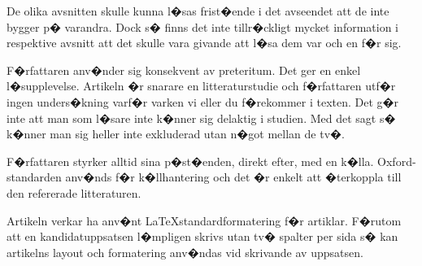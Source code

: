 \documentclass[11pt, oneside]{article}   	%
\begin{document}
De olika avsnitten skulle kunna l�sas frist�ende i det avseendet att de inte bygger p� varandra. Dock s� finns det inte tillr�ckligt mycket information i respektive avsnitt att det skulle vara givande att l�sa dem var och en f�r sig.

F�rfattaren anv�nder sig konsekvent av preteritum. Det ger en enkel l�supplevelse. Artikeln �r snarare en litteraturstudie och f�rfattaren utf�r ingen unders�kning varf�r varken vi eller du f�rekommer i texten. Det g�r inte att man som l�sare inte k�nner sig delaktig i studien. Med det sagt s� k�nner man sig heller inte exkluderad utan n�got mellan de tv�.

F�rfattaren styrker alltid sina p�st�enden, direkt efter, med en k�lla. Oxford-standarden anv�nds f�r k�llhantering och det �r enkelt att �terkoppla till den refererade litteraturen.

Artikeln verkar ha anv�nt \LaTeX standardformatering f�r artiklar. F�rutom att en kandidatuppsatsen l�mpligen skrivs utan tv� spalter per sida s� kan artikelns layout och formatering anv�ndas vid skrivande av uppsatsen.


\newpage


\end{document}
